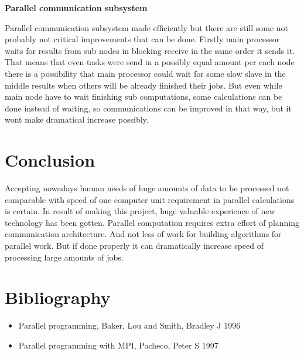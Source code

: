\documentclass[12pt]{article}
\begin{document}
\textbf{Parallel communication subsystem}

Parallel communication subsystem made efficiently but there are still some not probably not critical improvements that can be done.
Firstly main processor waits for results from sub nodes in blocking receive in the same order it sends it. That means that even tasks were send in a possibly equal amount per each node there is a possibility that main processor could wait for some slow slave in the middle results when others will be already finished their jobs. But even while main node have to wait finishing sub computations, some calculations can be done instead of waiting, so communications can be improved in that way, but it wont make dramatical increase possibly.







\section{Conclusion}




Accepting nowadays human needs of huge amounts of data to be processed not comparable with speed of one computer unit requirement in parallel calculations is certain.
In result of making this project, huge valuable experience of new technology has been gotten. Parallel computation requires extra effort of planning communication architecture. And not less of work for building algorithms for parallel work. But if done properly it can dramatically increase speed of processing large amounts of jobs.








\section{Bibliography}

\begin{itemize}

\item Parallel programming, Baker, Lou and Smith, Bradley J 1996
\item Parallel programming with MPI, Pacheco, Peter S 1997

\end{itemize}
\end{document}
